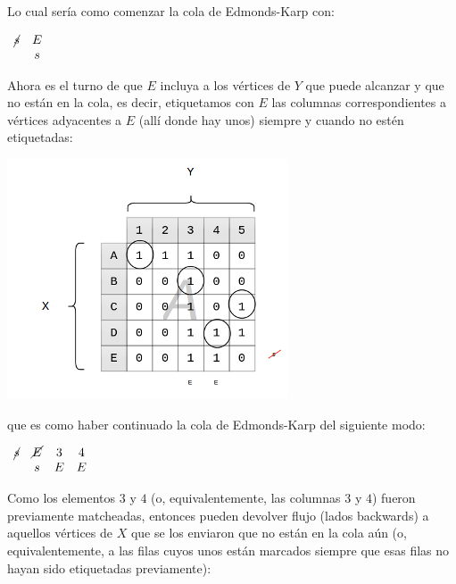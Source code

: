 \documentclass[10pt,a4paper]{article}
\begin{document}
Lo cual sería como comenzar la cola de Edmonds-Karp con:

\begin{center}
$\begin{array}{cc} \cancel{s}& E \\ & s \end{array}$
\end{center}

Ahora es el turno de que $E$ incluya a los vértices de $Y$ que puede alcanzar y que no están en la cola, es decir, etiquetamos con $E$ las columnas correspondientes a vértices adyacentes a $E$ (allí donde hay unos) siempre y cuando no estén etiquetadas:

\begin{center}

    \begin{adjustbox}{max size={\textwidth}{\textheight}}
        \includegraphics{definitions/matching_9.jpg}
        \end{adjustbox}
    
\end{center}

que es como haber continuado la cola de Edmonds-Karp del siguiente modo:

\begin{center}
$\begin{array}{cccc} \cancel{s}& \cancel{E} & 3 & 4 \\ & s & E & E \end{array}$
\end{center}

Como los elementos $3$ y $4$ (o, equivalentemente, las columnas $3$ y $4$) fueron previamente matcheadas, entonces pueden devolver flujo (lados backwards) a aquellos vértices de $X$ que se los enviaron que no están en la cola aún (o, equivalentemente, a las filas cuyos unos están marcados siempre que esas filas no hayan sido etiquetadas previamente):
\end{document}
